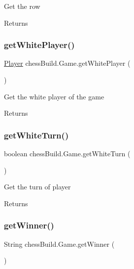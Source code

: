Get the row \begin{DoxyReturn}{Returns}

\end{DoxyReturn}
\mbox{\label{classchess_build_1_1_game_aa2ae560bff80ac9628ffee5b4fa57b33}} 
\subsubsection{\texorpdfstring{get\+White\+Player()}{getWhitePlayer()}}
{\footnotesize\ttfamily \hyperlink{classchess_build_1_1_player}{Player} chess\+Build.\+Game.\+get\+White\+Player (\begin{DoxyParamCaption}{ }\end{DoxyParamCaption})}

Get the white player of the game \begin{DoxyReturn}{Returns}

\end{DoxyReturn}
\mbox{\label{classchess_build_1_1_game_a5ef5fc90fd60545c3b70a1eff98ce306}} 
\subsubsection{\texorpdfstring{get\+White\+Turn()}{getWhiteTurn()}}
{\footnotesize\ttfamily boolean chess\+Build.\+Game.\+get\+White\+Turn (\begin{DoxyParamCaption}{ }\end{DoxyParamCaption})}

Get the turn of player \begin{DoxyReturn}{Returns}

\end{DoxyReturn}
\mbox{\label{classchess_build_1_1_game_af10e6d9b2b1192e1381a4ae3cffbca5c}} 
\subsubsection{\texorpdfstring{get\+Winner()}{getWinner()}}
{\footnotesize\ttfamily String chess\+Build.\+Game.\+get\+Winner (\begin{DoxyParamCaption}{ }\end{DoxyParamCaption})}

